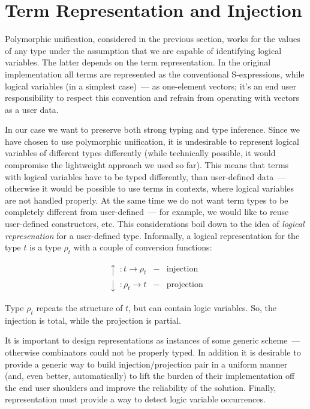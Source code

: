 \section{Term Representation and Injection}
\label{sec:injection}

Polymorphic unification, considered in the previous section, works for the values of any type under the assumption that we
are capable of identifying logical variables. The latter depends on the term representation. In the original
implementation all terms are represented as the conventional S-expressions, while logical variables (in a simplest case)~--- as one-element vectors; it's an end user responsibility to respect this convention and refrain from operating 
with vectors as a user data.

In our case we want to preserve both strong typing and type inference. Since we have chosen to use polymorphic 
unification, it is undesirable to represent logical variables of different types differently (while technically 
possible, it would compromise the lightweight approach we used so far). This means that terms with logical
variables have to be typed differently, than user-defined data~--- otherwise it would be possible to use
terms in contexts, where logical variables are not handled properly. At the same time we do not want term types
to be completely different from user-defined~--- for example, we would like to reuse user-defined constructors, etc.
This considerations boil down to the idea of \emph{logical represenation} for a user-defined type. Informally, 
a logical representation for the type $t$ is a type $\rho_t$ with a couple of conversion functions:
    
$$
\begin{array}{rcl}
   \uparrow  \;: t \to \rho_t & - & \mbox{injection}\\
   \downarrow\;: \rho_t \to t & - & \mbox{projection}
\end{array}
$$

Type $\rho_t$ repeats the structure of $t$, but can contain logic variables. So, the injection is total, 
while the projection is partial. 

It is important to design representations as instances of some generic scheme~--- otherwise \miniKanren combinators
could not be properly typed. In addition it is desirable to provide a generic way to build
injection/projection pair in a uniform manner (and, even better, automatically) to lift the burden of
their implementation off the end user shoulders and improve the reliability of the solution. Finally,
representation must provide a way to detect logic variable occurrences. 


